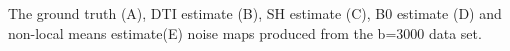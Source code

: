 \label{fig:corEstimate} The ground truth (A), DTI estimate (B), SH estimate (C), B0 estimate (D) and non-local means estimate(E) noise maps produced from the b=3000 data set.